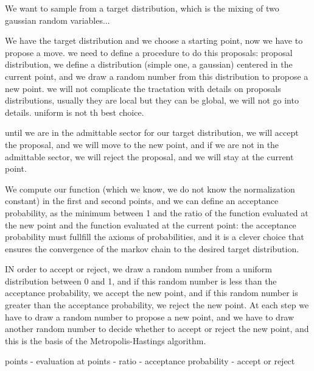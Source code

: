 \begin{example}
    We want to sample from a target distribution, which is the mixing of two gaussian random variables...

    We have the target distribution and we choose a starting point, now we have to propose a move. we need to define a procedure to do this proposals: proposal distribution, we define a distribution (simple one, a gaussian) centered in the current point, and we draw a random number from this distribution to propose a new point. we will not complicate the tractation with details on proposals distributions, usually they are local but they can be global, we will not go into details. uniform is not th best choice.

    until we are in the admittable sector for our target distribution, we will accept the proposal, and we will move to the new point, and if we are not in the admittable sector, we will reject the proposal, and we will stay at the current point.

    We compute our function (which we know, we do not know the normalization constant) in the first and second points, and we can define an acceptance probability, as the minimum between 1 and the ratio of the function evaluated at the new point and the function evaluated at the current point: the acceptance probability must fullfill the axioms of probabilities, and it is a clever choice that ensures the convergence of the markov chain to the desired target distribution.

    IN order to accept or reject, we draw a random number from a uniform distribution between 0 and 1, and if this random number is less than the acceptance probability, we accept the new point, and if this random number is greater than the acceptance probability, we reject the new point. At each step we have to draw a random number to propose a new point, and we have to draw another random number to decide whether to accept or reject the new point, and this is the basis of the Metropolis-Hastings algorithm.

    points - evaluation at points - ratio - acceptance probability - accept or reject


\end{example}
